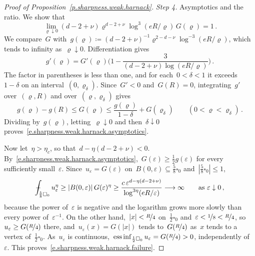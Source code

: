 \documentclass[11pt,letterpaper]{article}
\numberwithin{equation}{section}
\theoremstyle{definition}
\newcommand{\eps}{\varepsilon}
\newcommand{\nf}{\nicefrac}
\newcommand{\cu}{\square}
\DeclareMathOperator*{\essinf}{ess\,inf}
\def\Xint#1{\mathchoice
	{\XXint\displaystyle\textstyle{#1}}%
	{\XXint\textstyle\scriptstyle{#1}}%
	{\XXint\scriptstyle\scriptscriptstyle{#1}}%
	{\XXint\scriptscriptstyle\scriptscriptstyle{#1}}%
	\!\int}
\def\XXint#1#2#3{{\setbox0=\hbox{$#1{#2#3}{\int}$}
		\vcenter{\hbox{$#2#3$}}\kern-.5\wd0}}
\def\fint{\Xint-}
\begin{document}
\begin{proof}[Proof of Proposition~\ref{p.sharpness.weak.harnack}]
\smallskip
\emph{Step 4.} Asymptotics and the ratio. We show that
\begin{equation}
	\lim_{\varrho\downarrow0}(d-2+\nu)\varrho^{d-2+\nu}\log^3(eR/\varrho)\,G(\varrho)=1\,.
	\label{e.sharpness.weak.harnack.asymptotics}
\end{equation}
We compare~$G$ with~$g(\varrho)\coloneqq(d-2+\nu)^{-1}\varrho^{2-d-\nu}\log^{-3}(eR/\varrho)$, which tends to infinity as~$\varrho\downarrow0$. Differentiation gives
\begin{equation*}
	g'(\varrho)=G'(\varrho)\biggl(1-\frac3{(d-2+\nu)\log(eR/\varrho)}\biggr)\,.
\end{equation*}
The factor in parentheses is less than one, and for each~$0<\delta<1$ it exceeds~$1-\delta$ on an interval~$(0,\varrho_\delta)$. Since~$G'<0$ and~$G(R)=0$, integrating~$g'$ over~$(\varrho,R)$ and over~$(\varrho,\varrho_\delta)$ gives
\begin{equation*}
	g(\varrho)-g(R)\leq G(\varrho)\leq\frac{g(\varrho)}{1-\delta}+G(\varrho_\delta)\qquad(0<\varrho<\varrho_\delta)\,.
\end{equation*}
Dividing by~$g(\varrho)$, letting~$\varrho\downarrow0$ and then~$\delta\downarrow0$ proves~\eqref{e.sharpness.weak.harnack.asymptotics}.

\smallskip
Now let~$\eta>\eta_c$, so that~$d-\eta(d-2+\nu)<0$. By~\eqref{e.sharpness.weak.harnack.asymptotics},~$G(\eps)\geq\frac12g(\eps)$ for every sufficiently small~$\eps$. Since~$u_\eps=G(\eps)$ on~$B(0,\eps)\subseteq\frac58\cu_0$ and~$|\frac58\cu_0|\leq1$,
\begin{equation*}
	\fint_{\frac58\cu_0}u_\eps^\eta\geq|B(0,\eps)|\,G(\eps)^\eta\geq\frac{c\,\eps^{d-\eta(d-2+\nu)}}{\log^{3\eta}(eR/\eps)}\longrightarrow\infty\qquad\mbox{as }\eps\downarrow0\,,
\end{equation*}
because the power of~$\eps$ is negative and the logarithm grows more slowly than every power of~$\eps^{-1}$. On the other hand,~$|x|<\nf R4$ on~$\frac12\cu_0$ and~$\eps<\nf18<\nf R4$, so~$u_\eps\geq G(\nf R4)$ there, and~$u_\eps(x)=G(|x|)$ tends to~$G(\nf R4)$ as~$x$ tends to a vertex of~$\frac12\cu_0$. As~$u_\eps$ is continuous,~$\essinf_{\frac12\cu_0}u_\eps=G(\nf R4)>0$, independently of~$\eps$. This proves~\eqref{e.sharpness.weak.harnack.failure}.
\end{proof}
\end{document}
